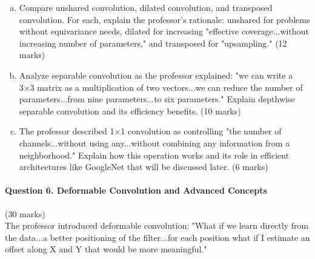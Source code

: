 \documentclass[12pt]{article}
\newcommand{\shortanswer}{\vspace{2cm}}
\newcommand{\mediumanswer}{\vspace{3cm}}
\newcommand{\journalspace}{\vspace{4.5cm}}
\begin{document}
\begin{enumerate}[(a)]
    \item Compare unshared convolution, dilated convolution, and transposed convolution. For each, explain the professor's rationale: unshared for problems without equivariance needs, dilated for increasing "effective coverage...without increasing number of parameters," and transposed for "upsampling." \hfill (12 marks)
    
    \journalspace
    
    \item Analyze separable convolution as the professor explained: "we can write a 3×3 matrix as a multiplication of two vectors...we can reduce the number of parameters...from nine parameters...to six parameters." Explain depthwise separable convolution and its efficiency benefits. \hfill (10 marks)
    
    \mediumanswer
    
    \item The professor described 1×1 convolution as controlling "the number of channels...without using any...without combining any information from a neighborhood." Explain how this operation works and its role in efficient architectures like GoogleNet that will be discussed later. \hfill (6 marks)
    
    \shortanswer
\end{enumerate}

\newpage
\paragraph{Question 6. Deformable Convolution and Advanced Concepts}{\hfill (30 marks)}\\
The professor introduced deformable convolution: "What if we learn directly from the data...a better positioning of the filter...for each position what if I estimate an offset along X and Y that would be more meaningful."
\end{document}
